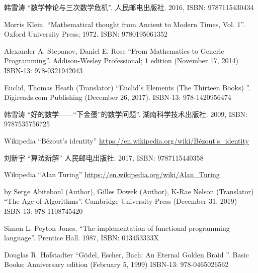 \documentclass{article}
\begin{document}
\ifx\wholebook\relax \else
\begin{thebibliography}{99}

{\fontspec{\cnmainft}韩雪涛 ``数学悖论与三次数学危机''. 人民邮电出版社. 2016, ISBN: 9787115430434}

Morris Klein. ``Mathematical thought from Ancient to Modern Times, Vol. 1''. Oxford University Press; 1972. ISBN: 9780195061352

Alexander A. Stepanov, Daniel E. Rose ``From Mathematics to Generic Programming''. Addison-Wesley Professional; 1 edition (November 17, 2014) ISBN-13: 978-0321942043

Euclid, Thomas Heath (Translator) ``Euclid's Elements (The Thirteen Books) ''. Digireads.com Publishing (December 26, 2017). ISBN-13: 978-1420956474

{\fontspec{\cnmainft}韩雪涛 ``好的数学——“下金蛋”的数学问题''. 湖南科学技术出版社. 2009, ISBN: 9787535756725}

Wikipedia ``Bézout's identity'' \url{https://en.wikipedia.org/wiki/Bézout's_identity}

{\fontspec{\cnmainft}刘新宇 ``算法新解'' 人民邮电出版社. 2017, ISBN: 9787115440358}

Wikipedia ``Alan Turing'' \url{https://en.wikipedia.org/wiki/Alan_Turing}

by Serge Abiteboul (Author), Gilles Dowek (Author), K-Rae Nelson (Translator) ``The Age of Algorithms''. Cambridge University Press (December 31, 2019) ISBN-13: 978-1108745420

Simon L. Peyton Jones. ``The implementation of functional programming language''. Prentice Hall. 1987, ISBN: 013453333X

Douglas R. Hofstadter ``Gödel, Escher, Bach: An Eternal Golden Braid ''. Basic Books; Anniversary edition (February 5, 1999) ISBN-13: 978-0465026562

\end{thebibliography}

\expandafter\enddocument

\fi
\end{document}
